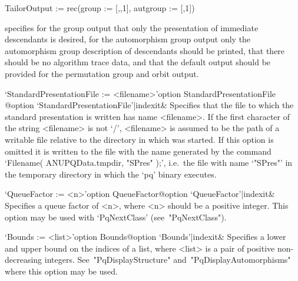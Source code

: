 \begintt
TailorOutput := rec(group := [,,1], autgroup := [,1])
\endtt

specifies for the group output that only the  presentation  of  immediate
descendants is desired,  for  the  automorphism  group  output  only  the
automorphism group description of descendants  should  be  printed,  that
there should be no algorithm trace data,  and  that  the  default  output
should be provided for the permutation group and orbit output.

\>`StandardPresentationFile := <filename>'{option StandardPresentationFile}%
@{option `StandardPresentationFile'|indexit}&
Specifies that the file to which the standard presentation is written has
name <filename>. If the first character of the string <filename>  is  not
`/', <filename> is assumed to be the path of a writable file relative  to
the directory in which {\GAP} was started. If this option is  omitted  it
is written to the file with the name generated by the command  `Filename(
ANUPQData.tmpdir, "SPres" );', i.e.~the file with name `"SPres"'  in  the
temporary directory in which the `pq' binary executes.

\>`QueueFactor := <n>'{option QueueFactor}@{option `QueueFactor'|indexit}&
Specifies a queue factor of <n>, where <n> should be a positive  integer.
This option may be used with `PqNextClass' (see~"PqNextClass").

\>`Bounds := <list>'{option Bounds}@{option `Bounds'|indexit}&
Specifies a lower and upper bound on the indices of a list, where  <list>
is a pair of positive non-decreasing  integers.  See~"PqDisplayStructure"
and~"PqDisplayAutomorphisms" where this option may be used.

\enditems

